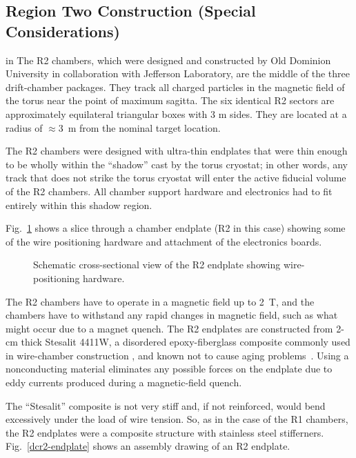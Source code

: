 
\subsection{Region Two Construction (Special Considerations)}

 in 
The R2 chambers, which were designed and constructed by Old Dominion University 
in collaboration with Jefferson Laboratory, are the middle of the three  
drift-chamber packages.  They track all charged particles in the magnetic field 
of the torus near the point of maximum sagitta.  The six identical R2 sectors 
are approximately equilateral triangular boxes with 3 m sides. 
They are located at a radius of $\approx$3~m from the nominal target location.  
  
The R2 chambers were designed with ultra-thin endplates that were thin enough
to be wholly within the ``shadow'' cast by the torus cryostat; in other words,
any track that does not strike the torus cryostat will enter the active fiducial 
volume of the R2 chambers. 
All chamber support hardware and electronics had to fit 
entirely within this shadow region.


Fig.~\ref{dc-corner} shows a slice through a chamber endplate (R2 in this case)
showing some of the wire positioning hardware and attachment of the electronics 
boards.
\begin{figure}[htpb]   
\vspace{8cm}
\caption{\small{Schematic cross-sectional view of the R2 endplate showing
wire-positioning hardware.}}
\label{dc-corner}
\end{figure}   


The R2 chambers have to operate 
in a magnetic field up to 2~T, and the chambers have to withstand any rapid 
changes in magnetic field, such as what might occur due to a magnet quench.
The R2 endplates are constructed from 2-cm thick Stesalit 4411W, a disordered 
epoxy-fiberglass composite commonly used in wire-chamber construction
\cite{stesalit}, and known not to cause aging problems~\cite{stesalitaging}.  
Using a nonconducting material eliminates any possible forces on the endplate 
due to eddy currents produced during a magnetic-field quench.  

The ``Stesalit'' composite is not very stiff and, if not reinforced, would
bend excessively under the load of wire tension.  So, as in the case of
the R1 chambers, the R2 endplates were a composite structure with
stainless steel stifferners.  Fig.~\ref{dcr2-endplate} shows an assembly drawing of an R2 endplate.

